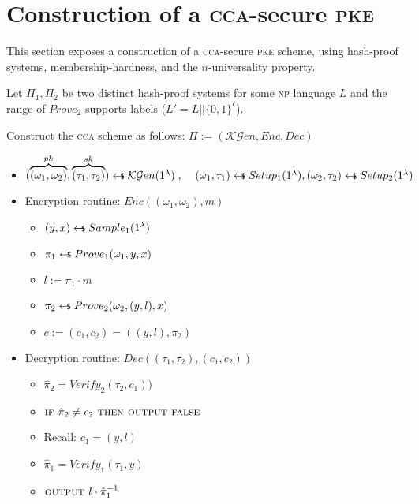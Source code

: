 
\section{Construction of a \textsc{cca}-secure \textsc{pke}}

This section exposes a construction of a \textsc{cca}-secure \textsc{pke} scheme, using hash-proof systems, membership-hardness, and the $n$-universality property.

Let $\Pi_1, \Pi_2$ be two distinct hash-proof systems for some \textsc{np} language $L$ and the range of $Prove_2$ supports labels ($L'=L||\{0, 1\}^\ell$).

Construct the \textsc{cca} scheme as follows: $\Pi := (\mathcal{KG}en, Enc, Dec)$
\begin{itemize}
    \item $ (\overbrace{(\omega_1,\omega_2)}^{pk}, \overbrace{(\tau_1,\tau_2)}^{sk}) \pickUAR \mathcal{KG}en(1^\lambda)\;,\;\;\;\;(\omega_1, \tau_1) \pickUAR Setup_1(1^\lambda), (\omega_2, \tau_2) \pickUAR Setup_2(1^\lambda)$
    \item Encryption routine: $Enc((\omega_1, \omega_2), m)$
    \begin{itemize}
        \item $ (y, x) \pickUAR Sample_1(1^\lambda)$
        \item $ \pi_1 \pickUAR Prove_1(\omega_1, y, x)$
        \item $ l := \pi_1 \cdot m$
        \item $ \pi_2 \pickUAR Prove_2(\omega_2, (y, l), x)$
        \item $ c := (c_1, c_2) = ((y, l), \pi_2)$
    \end{itemize}
    \item Decryption routine: $Dec((\tau_1, \tau_2), (c_1, c_2))$
    \begin{itemize}
        \item $\hat{\pi}_2 = Verify_2(\tau_2, c_1))$
        \item $\textsc{if } \hat{\pi}_2 \neq c_2 \textsc{ then output false}$
        \item Recall: $c_1 = (y, l)$
        \item $\hat{\pi}_1 = Verify_1(\tau_1, y)$
        \item $\textsc{output } l \cdot \hat{\pi}_1^{-1}$
    \end{itemize}
\end{itemize}

